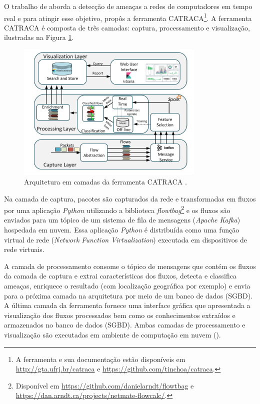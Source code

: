 O trabalho de  aborda a detecção de ameaças a redes de
computadores em tempo real e para atingir esse objetivo, propôs a ferramenta
CATRACA\footnote{
    A ferramenta e sua documentação estão disponíveis em \url{http://gta.ufrj.br/catraca}
    e \url{https://github.com/tinchoa/catraca}.
}.
A ferramenta CATRACA é composta de três camadas: captura, processamento e
visualização, ilustradas na Figura \ref{fig:catraca}.

\begin{figure}[ht]
\centering
\includegraphics[width=0.8\textwidth]{figuras/catraca-arch.png}
\caption{Arquitetura em camadas da ferramenta CATRACA \cite{Lopez2018}.}
\label{fig:catraca}
\end{figure}


Na camada de captura, pacotes são capturados da rede e transformadas em fluxos
por uma aplicação \emph{Python} utilizando a biblioteca \emph{flowtbag}\footnote{
    Disponível em \url{https://github.com/danielarndt/flowtbag} e
    \url{https://dan.arndt.ca/projects/netmate-flowcalc/}.
}
e os fluxos são enviados para um tópico de um sistema de fila de mensagens
(\emph{Apache Kafka}) hospedada em nuvem.
Essa aplicação \emph{Python} é distribuída como uma função virtual de rede
(\emph{Network Function Virtualization}) executada em dispositivos de rede
virtuais.

A camada de processamento consome o tópico de mensagens que contém os fluxos
da camada de captura e extrai características dos fluxos, detecta e classifica ameaças,
enriquece o resultado (com localização geográfica por exemplo) e envia para a
próxima camada na arquitetura por meio de um banco de dados (SGBD).
A última camada da ferramenta fornece uma interface gráfica que apresentada a
visualização dos fluxos processados bem como os conhecimentos extraídos e
armazenados no banco de dados (SGBD).
Ambas camadas de processamento e visualização são executadas em ambiente de
computação em nuvem (\cloud).

